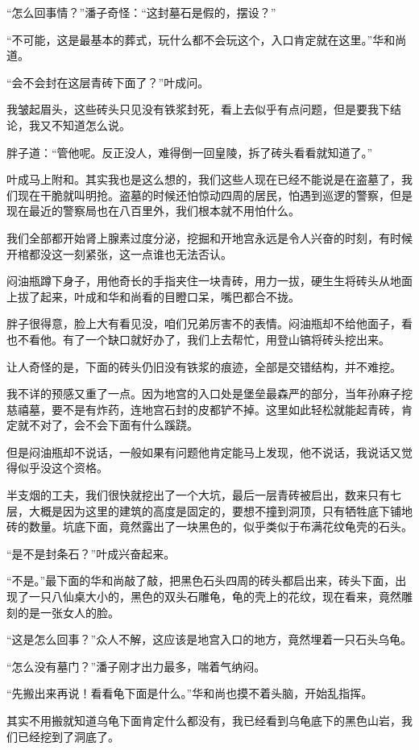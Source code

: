 “怎么回事情？”潘子奇怪：“这封墓石是假的，摆设？”

“不可能，这是最基本的葬式，玩什么都不会玩这个，入口肯定就在这里。”华和尚道。

“会不会封在这层青砖下面了？”叶成问。

我皱起眉头，这些砖头只见没有铁浆封死，看上去似乎有点问题，但是要我下结论，我又不知道怎么说。

胖子道：“管他呢。反正没人，难得倒一回皇陵，拆了砖头看看就知道了。”

叶成马上附和。其实我也是这么想的，我们这些人现在已经不能说是在盗墓了，我们现在干脆就叫明抢。盗墓的时候还怕惊动四周的居民，怕遇到巡逻的警察，但是现在最近的警察局也在八百里外，我们根本就不用怕什么。

我们全部都开始肾上腺素过度分泌，挖掘和开地宫永远是令人兴奋的时刻，有时候开棺都没这一刻紧张，这一点谁也无法否认。

闷油瓶蹲下身子，用他奇长的手指夹住一块青砖，用力一拔，硬生生将砖头从地面上拔了起来，叶成和华和尚看的目瞪口呆，嘴巴都合不拢。

胖子很得意，脸上大有看见没，咱们兄弟厉害不的表情。闷油瓶却不给他面子，看也不看他。有了一个缺口就好办了，我们上去帮忙，用登山镐将砖头挖出来。

让人奇怪的是，下面的砖头仍旧没有铁浆的痕迹，全部是交错结构，并不难挖。

我不详的预感又重了一点。因为地宫的入口处是堡垒最森严的部分，当年孙麻子挖慈禧墓，要不是有炸药，连地宫石封的皮都铲不掉。这里如此轻松就能起青砖，肯定就不对了，会不会下面有什么蹊跷。

但是闷油瓶却不说话，一般如果有问题他肯定能马上发现，他不说话，我说话又觉得似乎没这个资格。

半支烟的工夫，我们很快就挖出了一个大坑，最后一层青砖被启出，数来只有七层，大概是因为这里的建筑的高度是固定的，要想不撞到洞顶，只有牺牲底下铺地砖的数量。坑底下面，竟然露出了一块黑色的，似乎类似于布满花纹龟壳的石头。

“是不是封条石？”叶成兴奋起来。

“不是。”最下面的华和尚敲了敲，把黑色石头四周的砖头都启出来，砖头下面，出现了一只八仙桌大小的，黑色的双头石雕龟，龟的壳上的花纹，现在看来，竟然雕刻的是一张女人的脸。

“这是怎么回事？”众人不解，这应该是地宫入口的地方，竟然埋着一只石头乌龟。

“怎么没有墓门？”潘子刚才出力最多，喘着气纳闷。

“先搬出来再说！看看龟下面是什么。”华和尚也摸不着头脑，开始乱指挥。

其实不用搬就知道乌龟下面肯定什么都没有，我已经看到乌龟底下的黑色山岩，我们已经挖到了洞底了。

